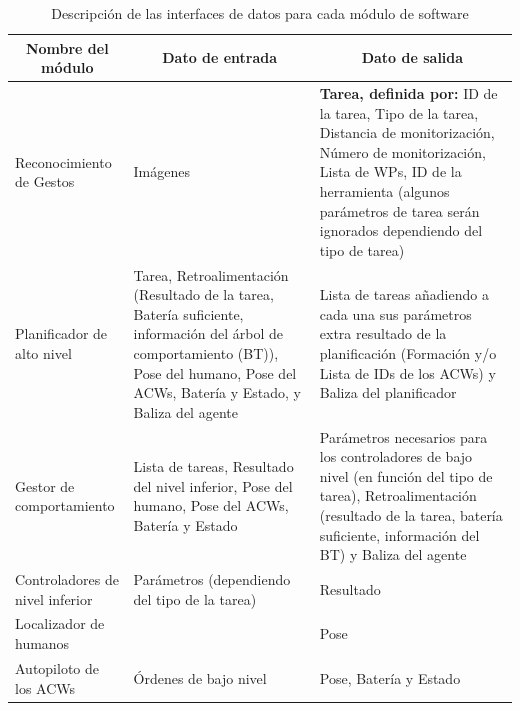 \documentclass[fontsize=11pt, English=false, Español=true, Myfinal=true, twoside, numbers=noenddot]{scrbook}
\begin{document}
\begin{table}[ht]
    \centering
    \caption{Descripción de las interfaces de datos para cada módulo de software}
    \label{tab:interfaces}
    \small
    \begin{tabular}{|p{}|p{}|p{}|}
      \hline
      \multicolumn{1}{|c}{\textbf{Nombre del módulo}} & \multicolumn{1}{|c|}{\textbf{Dato de entrada}} & \multicolumn{1}{c|}{\textbf{Dato de salida}}\\ \hline \hline
      Reconocimiento de Gestos & Imágenes & \textbf{Tarea, definida por:} ID de la tarea, Tipo de la tarea, Distancia de monitorización, Número de monitorización, Lista de WPs, ID de la herramienta (algunos parámetros de tarea serán ignorados dependiendo del tipo de tarea) \\ \hline
      
     Planificador de alto nivel & Tarea, Retroalimentación (Resultado de la tarea, Batería suficiente, información del árbol de comportamiento (\gls{BT})), Pose del humano, Pose del \glspl{ACW}, Batería y Estado, y Baliza del agente & Lista de tareas añadiendo a cada una sus parámetros extra resultado de la planificación (Formación y/o Lista de IDs de los \glspl{ACW}) y Baliza del planificador\\\hline
      
      Gestor de comportamiento & Lista de tareas, Resultado del nivel inferior, Pose del humano, Pose del \glspl{ACW}, Batería y Estado & Parámetros necesarios para los controladores de bajo nivel (en función del tipo de tarea), Retroalimentación (resultado de la tarea, batería suficiente, información del BT) y Baliza del agente \\ \hline
      
      Controladores de nivel inferior & Parámetros (dependiendo del tipo de la tarea) & Resultado \\ \hline
      
      Localizador de humanos &  & Pose \\ \hline
      
      Autopiloto de los \glspl{ACW} & Órdenes de bajo nivel & Pose, Batería y Estado \\ \hline
      
    \end{tabular}
\end{table}
\end{document}
